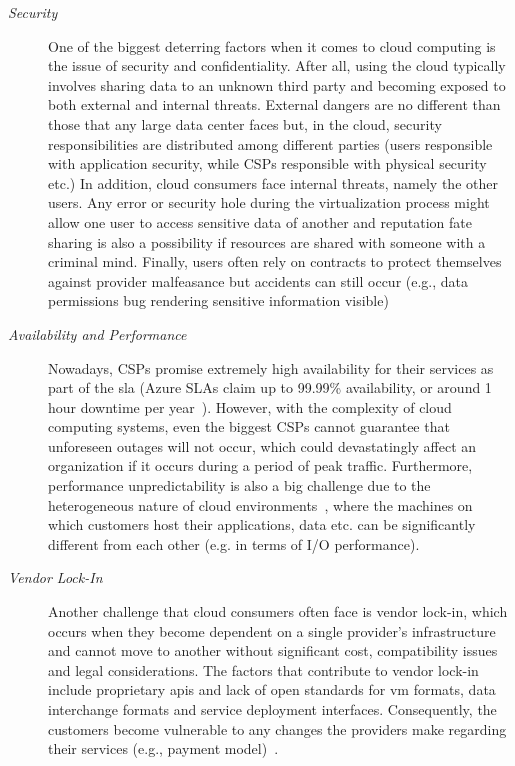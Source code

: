 \begin{description}
    \item [\textit{Security}] One of the biggest deterring factors when it comes to cloud computing is the issue of security and confidentiality. After all, using the cloud typically involves sharing data to an unknown third party and becoming exposed to both external and internal threats. External dangers are no different than those that any large data center faces but, in the cloud, security responsibilities are distributed among different parties (users responsible with application security, while CSPs responsible with physical security etc.) In addition, cloud consumers face internal threats, namely the other users. Any error or security hole during the virtualization process might allow one user to access sensitive data of another and reputation fate sharing is also a possibility if resources are shared with someone with a criminal mind. Finally, users often rely on contracts to protect themselves against provider malfeasance but accidents can still occur (e.g., data permissions bug rendering sensitive information visible)

    \item[\textit{Availability and Performance}] Nowadays, CSPs promise extremely high availability for their services as part of the \ac{sla} (Azure SLAs claim up to 99.99\% availability, or around 1 hour downtime per year~\cite{availability}). However, with the complexity of cloud computing systems,  even the biggest CSPs cannot guarantee that unforeseen outages will not occur, which could devastatingly affect an organization if it occurs during a period of peak traffic. Furthermore, performance unpredictability is also a big challenge due to the heterogeneous nature of cloud environments~\cite{performance}, where the machines on which customers host their applications, data etc. can be significantly different from each other (e.g. in terms of I/O performance).

    \item[\textit{Vendor Lock-In}]  Another challenge that cloud consumers often face is vendor lock-in,  which occurs when they become dependent on a single provider's infrastructure and cannot move to another without significant cost, compatibility issues and legal considerations. The factors that contribute to vendor lock-in include proprietary \acp{api} and lack of open standards for \ac{vm} formats, data interchange formats and service deployment interfaces. Consequently, the customers become vulnerable to any changes the providers make regarding their services (e.g., payment model)~\cite{lock-in}.


\end{description}
